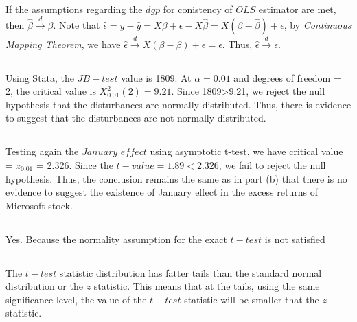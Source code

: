 \subsection{}
If the assumptions regarding the $dgp$  for conistency of $OLS$ estimator are met, then $\hat{\beta} \overset{d}{\rightarrow} \beta$. Note that $\hat{\epsilon} = y - \hat{y} =  X\beta + \epsilon - X\hat{\beta} = X(\beta - \hat{\beta}) + \epsilon$, by \textit{Continuous Mapping Theorem}, we have  $\hat{\epsilon} \overset{d}{\rightarrow} X(\beta - \beta) + \epsilon = \epsilon$. Thus, $\hat{\epsilon} \overset{d}{\rightarrow} \epsilon$.

\subsection{}

Using Stata, the $JB-test$ value is 1809. At $\alpha=0.01$ and degrees of freedom  = 2, the critical value is $X^2_{0.01}(2) = 9.21$. Since 1809>9.21, we reject the null hypothesis that the disturbances are normally distributed. Thus, there is evidence to suggest that the disturbances are not normally distributed.

\subsection{}
Testing again the $January$ $effect$ using asymptotic t-test, we have critical value =  $z_{0.01}$ = 2.326. Since the $t-value = 1.89 < 2.326$, we fail to reject the null hypothesis. Thus, the conclusion remains the same as in part (b) that there is no evidence to suggest the existence of January effect in the excess returns of Microsoft stock. 

\subsection{}
Yes. Because the normality assumption for the exact $t-test$ is not satisfied

\subsection{}
The $t-test$ statistic distribution has fatter tails than the standard normal distribution or the $z$ statistic. This means that at the tails, using the same significance level, the value of the $t-test$ statistic will be smaller that the $z$ statistic.
